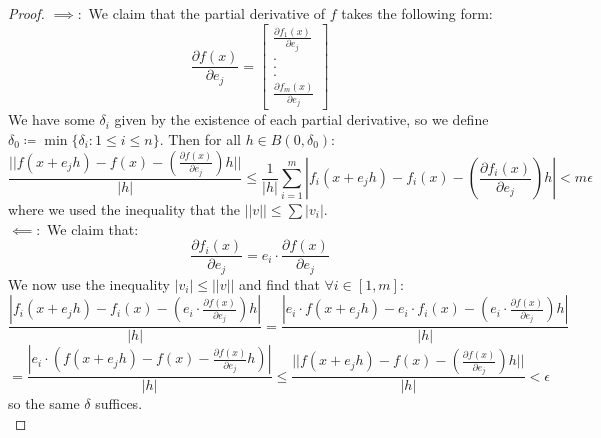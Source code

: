 \documentclass[10pt,letterpaper]{article} %
\begin{document}
\begin{proof}
$\implies:$ We claim that the partial derivative of $f$ takes the following form:
\begin{equation*}
 \frac{\partial f(x)}{\partial e_j} = \begin{bmatrix}
\frac{\partial f_1(x)}{\partial e_j}\\.\\.\\.\\\frac{\partial f_m(x)}{\partial e_j}\end{bmatrix}
\end{equation*}
We have some $\delta_i$ given by the existence of each partial derivative, so we define $\delta_0 \coloneq \min\{\delta_i : 1 \leqslant i \leqslant n\}$.
Then for all $h \in B(0, \delta_0)$:
\begin{equation*}
\frac{||f(x+e_jh) - f(x) - (\frac{\partial f(x)}{\partial e_j})h||}{|h|} \leqslant \frac{1}{|h|}\sum_{i=1}^{m}\left|f_i(x+e_jh) - f_i(x) - \left(\frac{\partial f_i(x)}{\partial e_j}\right)h\right| < m\epsilon
\end{equation*}
where we used the inequality that the $||v|| \leqslant \sum |v_i|$.\\

$\impliedby:$ We claim that:
\begin{equation*}
\frac{\partial f_i(x)}{\partial e_j} = e_i \cdot \frac{\partial f(x)}{\partial e_j}
\end{equation*}
We now use the inequality $|v_i| \leqslant ||v||$ and find that $\forall i \in [1, m]$:
\begin{equation*}
\frac{|f_i(x+e_jh) - f_i(x) - (e_i \cdot \frac{\partial f(x)}{\partial e_j})h|}{|h|} = \frac{|e_i \cdot f(x+e_jh) - e_i \cdot f_i(x) - (e_i \cdot \frac{\partial f(x)}{\partial e_j})h|}{|h|}
\end{equation*}
\begin{equation*}
= \frac{|e_i \cdot (f(x+e_jh) - f(x) - \frac{\partial f(x)}{\partial e_j}h)|}{|h|}\leqslant \frac{||f(x+e_jh) - f(x) - (\frac{\partial f(x)}{\partial e_j})h||}{|h|} < \epsilon
\end{equation*}
so the same $\delta$ suffices.\\
\end{proof}
\end{document}
